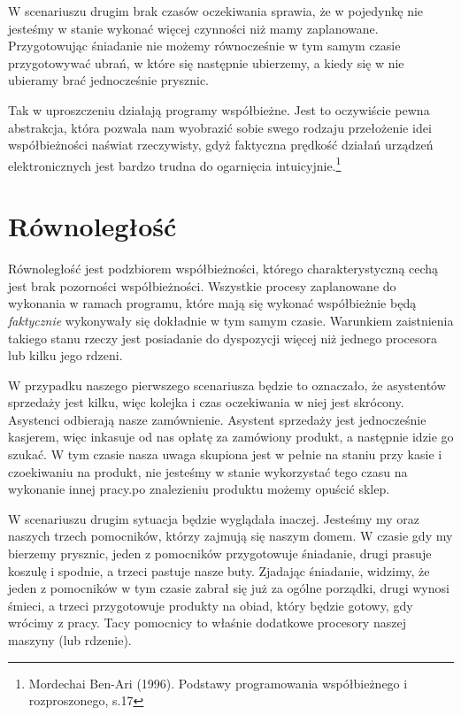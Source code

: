W scenariuszu drugim brak czasów oczekiwania sprawia, że w pojedynkę nie jesteśmy w stanie wykonać więcej czynności niż mamy zaplanowane. Przygotowując śniadanie nie możemy równocześnie w tym samym czasie przygotowywać ubrań, w które się następnie ubierzemy, a kiedy się w nie ubieramy brać jednocześnie prysznic.

Tak w uproszczeniu działają programy współbieżne. Jest to oczywiście pewna abstrakcja, która pozwala nam wyobrazić sobie swego rodzaju przełożenie idei współbieżności naświat rzeczywisty, gdyż faktyczna prędkość działań urządzeń elektronicznych jest bardzo trudna do ogarnięcia intuicyjnie.\footnote{Mordechai Ben-Ari (1996). Podstawy programowania współbieżnego i rozproszonego, s.17}

\section{Równoległość}
Równoległość jest podzbiorem współbieżności, którego charakterystyczną cechą jest brak pozorności współbieżności. Wszystkie procesy zaplanowane do wykonania w ramach programu, które mają się wykonać współbieżnie będą \emph{faktycznie} wykonywały się dokładnie w tym samym czasie. Warunkiem zaistnienia takiego stanu rzeczy jest posiadanie do dyspozycji więcej niż jednego procesora lub kilku jego rdzeni.

W przypadku naszego pierwszego scenariusza będzie to oznaczało, że asystentów sprzedaży jest kilku, więc kolejka i czas oczekiwania w niej jest skrócony. Asystenci odbierają nasze zamównienie. Asystent sprzedaży jest jednocześnie kasjerem, więc inkasuje od nas opłatę za zamówiony produkt, a następnie idzie go szukać. W tym czasie nasza uwaga skupiona jest w pełnie na staniu przy kasie i czoekiwaniu na produkt, nie jesteśmy w stanie wykorzystać tego czasu na wykonanie innej pracy.po znalezieniu produktu możemy opuścić sklep.

W scenariuszu drugim sytuacja będzie wyglądała inaczej. Jesteśmy my oraz naszych trzech pomocników, którzy zajmują się naszym domem. W czasie gdy my bierzemy prysznic, jeden z pomocników przygotowuje śniadanie, drugi prasuje koszulę i spodnie, a trzeci pastuje nasze buty. Zjadając śniadanie, widzimy, że jeden z pomocników w tym czasie zabrał się już za ogólne porządki, drugi wynosi śmieci, a trzeci przygotowuje produkty na obiad, który będzie gotowy, gdy wrócimy z pracy. Tacy pomocnicy to właśnie dodatkowe procesory naszej maszyny (lub rdzenie).